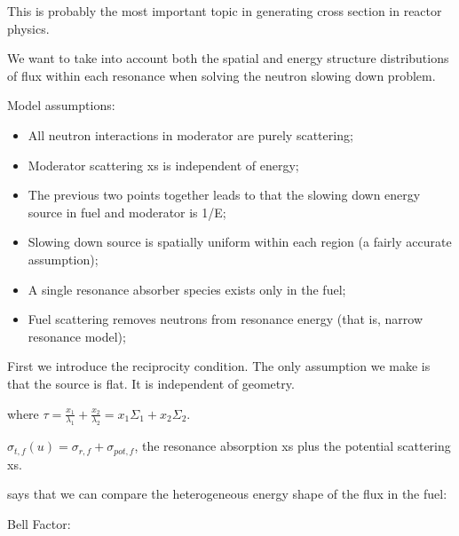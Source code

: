 \documentclass{school-22.211-notes}
\date{March  5, 2012}
\begin{document}
\maketitle


This is probably the most important topic in generating cross section in reactor physics. 

We want to take into account both the spatial and energy structure distributions of flux within each resonance when solving the neutron slowing down problem. 

Model assumptions:
\begin{itemize}
\item All neutron interactions in moderator are purely scattering;
\item Moderator scattering xs is independent of energy;
\item The previous two points together leads to that the slowing down energy source in fuel and moderator is 1/E;
\item Slowing down source is spatially uniform within each region (a fairly accurate assumption);
\item A single resonance absorber species exists only in the fuel;
\item Fuel scattering removes neutrons from resonance energy (that is, narrow resonance model); 
\end{itemize}

First we introduce the reciprocity condition. The only assumption we make is that the source is flat. It is independent of geometry. 


where $\tau = \frac{x_1}{\lambda_1} + \frac{x_2}{\lambda_2} = x_1 \Sigma_1 + x_2 \Sigma_2$. 







$\sigma_{t,f}(u) = \sigma_{r,f} + \sigma_{pot, f}$, the resonance absorption xs plus the potential scattering xs. 


 says that we can compare the heterogeneous energy shape of the flux in the fuel: 


Bell Factor: 
\end{document}
